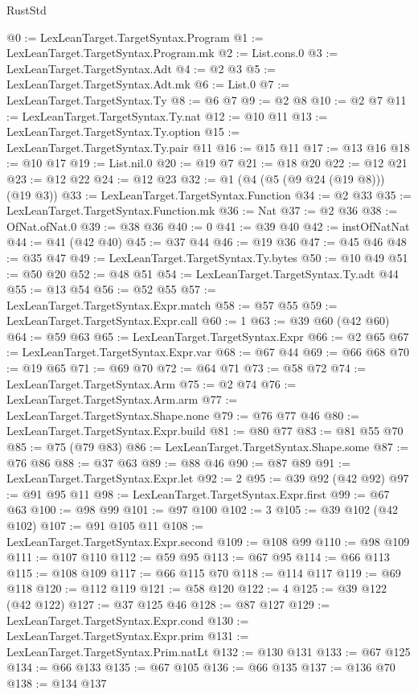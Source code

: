 \begin{lexlean}{RustStd}
\begin{coremodule}
@0 := LexLeanTarget.TargetSyntax.Program
@1 := LexLeanTarget.TargetSyntax.Program.mk
@2 := List.cons.{0}
@3 := LexLeanTarget.TargetSyntax.Adt
@4 := @2 @3
@5 := LexLeanTarget.TargetSyntax.Adt.mk
@6 := List.{0}
@7 := LexLeanTarget.TargetSyntax.Ty
@8 := @6 @7
@9 := @2 @8
@10 := @2 @7
@11 := LexLeanTarget.TargetSyntax.Ty.nat
@12 := @10 @11
@13 := LexLeanTarget.TargetSyntax.Ty.option
@15 := LexLeanTarget.TargetSyntax.Ty.pair @11
@16 := @15 @11
@17 := @13 @16
@18 := @10 @17
@19 := List.nil.{0}
@20 := @19 @7
@21 := @18 @20
@22 := @12 @21
@23 := @12 @22
@24 := @12 @23
@32 := @1 (@4 (@5 (@9 @24 (@19 @8))) (@19 @3))
@33 := LexLeanTarget.TargetSyntax.Function
@34 := @2 @33
@35 := LexLeanTarget.TargetSyntax.Function.mk
@36 := Nat
@37 := @2 @36
@38 := OfNat.ofNat.{0}
@39 := @38 @36
@40 := 0
@41 := @39 @40
@42 := instOfNatNat
@44 := @41 (@42 @40)
@45 := @37 @44
@46 := @19 @36
@47 := @45 @46
@48 := @35 @47
@49 := LexLeanTarget.TargetSyntax.Ty.bytes
@50 := @10 @49
@51 := @50 @20
@52 := @48 @51
@54 := LexLeanTarget.TargetSyntax.Ty.adt @44
@55 := @13 @54
@56 := @52 @55
@57 := LexLeanTarget.TargetSyntax.Expr.match
@58 := @57 @55
@59 := LexLeanTarget.TargetSyntax.Expr.call
@60 := 1
@63 := @39 @60 (@42 @60)
@64 := @59 @63
@65 := LexLeanTarget.TargetSyntax.Expr
@66 := @2 @65
@67 := LexLeanTarget.TargetSyntax.Expr.var
@68 := @67 @44
@69 := @66 @68
@70 := @19 @65
@71 := @69 @70
@72 := @64 @71
@73 := @58 @72
@74 := LexLeanTarget.TargetSyntax.Arm
@75 := @2 @74
@76 := LexLeanTarget.TargetSyntax.Arm.arm
@77 := LexLeanTarget.TargetSyntax.Shape.none
@79 := @76 @77 @46
@80 := LexLeanTarget.TargetSyntax.Expr.build
@81 := @80 @77
@83 := @81 @55 @70
@85 := @75 (@79 @83)
@86 := LexLeanTarget.TargetSyntax.Shape.some
@87 := @76 @86
@88 := @37 @63
@89 := @88 @46
@90 := @87 @89
@91 := LexLeanTarget.TargetSyntax.Expr.let
@92 := 2
@95 := @39 @92 (@42 @92)
@97 := @91 @95 @11
@98 := LexLeanTarget.TargetSyntax.Expr.first
@99 := @67 @63
@100 := @98 @99
@101 := @97 @100
@102 := 3
@105 := @39 @102 (@42 @102)
@107 := @91 @105 @11
@108 := LexLeanTarget.TargetSyntax.Expr.second
@109 := @108 @99
@110 := @98 @109
@111 := @107 @110
@112 := @59 @95
@113 := @67 @95
@114 := @66 @113
@115 := @108 @109
@117 := @66 @115 @70
@118 := @114 @117
@119 := @69 @118
@120 := @112 @119
@121 := @58 @120
@122 := 4
@125 := @39 @122 (@42 @122)
@127 := @37 @125 @46
@128 := @87 @127
@129 := LexLeanTarget.TargetSyntax.Expr.cond
@130 := LexLeanTarget.TargetSyntax.Expr.prim
@131 := LexLeanTarget.TargetSyntax.Prim.natLt
@132 := @130 @131
@133 := @67 @125
@134 := @66 @133
@135 := @67 @105
@136 := @66 @135
@137 := @136 @70
@138 := @134 @137

\end{coremodule}
\end{lexlean}
